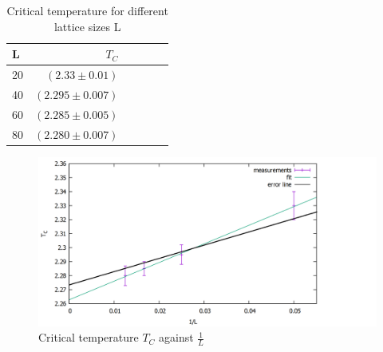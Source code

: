 \documentclass[10pt,a4paper]{article}
\begin{document}
\begin{table}[h!]
	\centering
	\begin{tabular}{|l|r|c|lrp{16cm}}\hline
		L & $T_C$ \\\hline
		20 & $(2.33 \pm 0.01)$\\
		40 & $(2.295 \pm 0.007)$\\
		60 & $(2.285 \pm 0.005)$\\
		80 & $(2.280 \pm 0.007)$\\\hline
	\end{tabular}
	\caption{Critical temperature for different lattice sizes L }
	\label{tc}
\end{table}

\begin{figure}[h]
	\includegraphics[scale = 0.25]{tc2.png}
	\centering
	\caption{Critical temperature $T_C$ against $\frac{1}{L}$}
	\label{tc2}
\end{figure}
\end{document}
